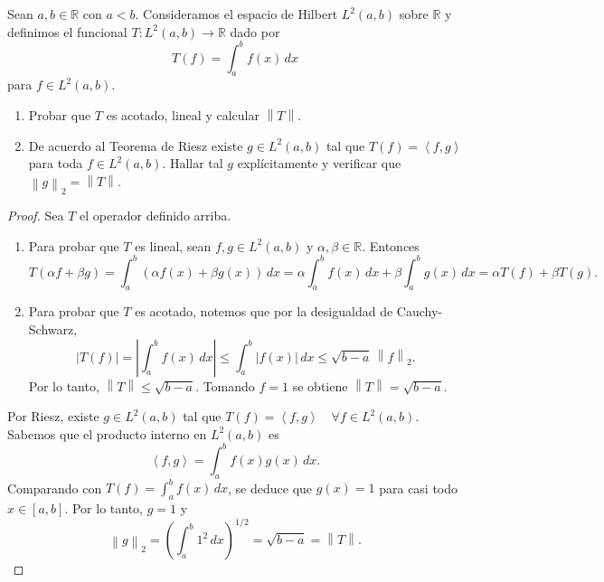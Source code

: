\documentclass{article}
\theoremstyle{definition}
\newcommand{\R}{\mathbb{R}}
\newcommand{\norm}[1]{\left\lVert #1 \right\rVert}       %
\newcommand{\ip}[2]{\left\langle #1, #2 \right\rangle}   %
\newenvironment{ejercicio}[1]{\begin{trivlist}
\item[\hskip \labelsep {\bfseries Ejercicio}\hskip \labelsep {\bfseries #1.}]}{\end{trivlist}}
\begin{document}
\vspace{0.5cm}

\begin{ejercicio}{6}
	Sean \( a, b \in \R \) con \( a < b \). Consideramos el espacio de Hilbert \( L^2(a, b) \) sobre \( \R \) y definimos el funcional \( T : L^2(a, b) \to \R \) dado por
	\[ T(f) = \int_a^b f(x) \, dx \]
	para \( f \in L^2(a, b) \).
	\begin{enumerate}
		\item Probar que \( T \) es acotado, lineal y calcular \( \norm{T} \).
		\item De acuerdo al Teorema de Riesz existe \( g \in L^2(a, b) \) tal que \( T(f) = \ip{f}{g} \) para toda \( f \in L^2(a, b) \). Hallar tal \( g \) explícitamente y verificar que \( \norm{g}_2 = \norm{T} \).
	\end{enumerate}
\end{ejercicio}
\begin{proof}
	Sea \( T \) el operador definido arriba.
	\begin{enumerate}[label=\roman*.]
		\item Para probar que \( T \) es lineal, sean \( f, g \in L^2(a, b) \) y \( \alpha, \beta \in \R \). Entonces
		      \[
			      T(\alpha f + \beta g) = \int_a^b (\alpha f(x) + \beta g(x)) \, dx = \alpha \int_a^b f(x) \, dx + \beta \int_a^b g(x) \, dx = \alpha T(f) + \beta T(g).
		      \]
		\item Para probar que \( T \) es acotado, notemos que por la desigualdad de Cauchy-Schwarz,
		      \[
			      |T(f)| = \left| \int_a^b f(x) \, dx \right| \le \int_a^b |f(x)| \, dx \le \sqrt{b-a} \, \norm{f}_2.
		      \]
		      Por lo tanto, \( \norm{T} \le \sqrt{b-a} \). Tomando \( f = 1 \) se obtiene \( \norm{T} = \sqrt{b-a} \).
	\end{enumerate}
	Por Riesz, existe \( g \in L^2(a, b) \) tal que \( T(f) = \ip{f}{g} \quad \forall f \in L^2(a, b) \). Sabemos que el producto interno en \( L^2(a, b) \) es
	\[
		\ip{f}{g} = \int_a^b f(x) g(x) \, dx.
	\]
	Comparando con \( T(f) = \int_a^b f(x) \, dx \), se deduce que \( g(x) = 1 \) para casi todo \( x \in [a, b] \). Por lo tanto, \( g = 1 \) y
	\[
		\norm{g}_2 = {\left( \int_a^b 1^2 \, dx \right)}^{1/2} = \sqrt{b-a} = \norm{T}.
	\]
\end{proof}

\vspace{0.5cm}
\end{document}
